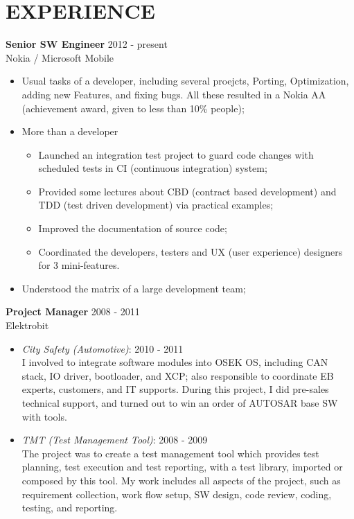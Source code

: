 
\section{EXPERIENCE}
\textbf{Senior SW Engineer} \hfill 2012 - present\\
        Nokia / Microsoft Mobile
        \begin{itemize}  \itemsep -2pt %
        \item Usual tasks of a developer, including several proejcts,
        Porting, Optimization, adding new Features, and fixing bugs.
        All these resulted in a Nokia AA (achievement award, given to less than 10\% people);
        \item More than a developer
            \begin{itemize}  \itemsep -2pt
                \item Launched an integration test project to guard code changes
                with scheduled tests in CI (continuous integration) system;
                \item Provided some lectures about CBD (contract based development) and
                TDD (test driven development) via practical examples;
                \item Improved the documentation of source code;
                \item Coordinated the developers, testers and UX (user experience) designers for 3 mini-features.
            \end{itemize}
        \item Understood the matrix of a large development team;
        \end{itemize}

\textbf{Project Manager} \hfill 2008 - 2011\\
        Elektrobit
        \begin{itemize}  \itemsep -2pt %
            \item {\em City Safety (Automotive)}: 2010 - 2011 \\
                    I involved to integrate software modules into OSEK OS,
                    including CAN stack, IO driver, bootloader, and XCP;
                    also responsible to coordinate EB experts, customers, and IT supports.
                    During this project, I did pre-sales technical support,
                    and turned out to win an order of AUTOSAR base SW with tools.
            \item {\em TMT (Test Management Tool)}: 2008 - 2009 \\
                    The project was to create a test management tool
                    which provides test planning, test execution and test reporting,
                    with a test library, imported or composed by this tool.
                    My work includes all aspects of the project,
                    such as requirement collection, work flow setup, SW design, code review, coding, testing, and reporting.
        \end{itemize}
 
